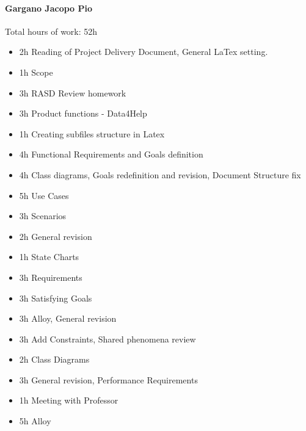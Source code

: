 \documentclass{report}
\begin{document}
		\paragraph{Gargano Jacopo Pio} Total hours of work: 52h
			\begin{itemize}
				\item 2h Reading of Project Delivery Document, General LaTex setting.
				\item 1h Scope
				\item 3h RASD Review homework
				\item 3h Product functions - Data4Help
				\item 1h Creating subfiles structure in Latex
				\item 4h Functional Requirements and Goals definition 
				\item 4h Class diagrams, Goals redefinition and revision, Document Structure fix
				\item 5h Use Cases
				\item 3h Scenarios
				\item 2h General revision
				\item 1h State Charts
				\item 3h Requirements
				\item 3h Satisfying Goals
				\item 3h Alloy, General revision
				\item 3h Add Constraints, Shared phenomena review
				\item 2h Class Diagrams
				\item 3h General revision, Performance Requirements
				\item 1h Meeting with Professor
				\item 5h Alloy
			\end{itemize}
\end{document}
